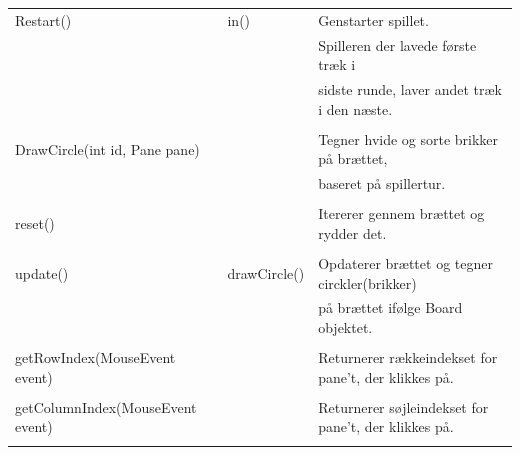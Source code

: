 \begin{table}[H]
\begin{tabular}{lll}
                            Restart() & in() & Genstarter spillet. \\
                         &         &        Spilleren der lavede første træk i \\      &         & sidste runde, laver andet træk i den næste.\\
                         \\
                         DrawCircle(int id, Pane pane) & & Tegner hvide og sorte brikker på brættet, \\
                         & & baseret på spillertur.
                         \\
                         \\
                          reset()                              &                 & Itererer gennem brættet og rydder det.                       \\
                                             &                 &                                                           \\
        update()                             & drawCircle()    & Opdaterer brættet og tegner circkler(brikker)              \\
                                             &                 & på brættet ifølge Board objektet.                          \\
                                             \\
         getRowIndex(MouseEvent event)        &                 & Returnerer rækkeindekset for pane't, der klikkes på.      \\
                                             &                 &                                                           \\
        getColumnIndex(MouseEvent event)     &                 & Returnerer søjleindekset for pane't, der klikkes på.      \\
                                             &                 &                                                           \\
 \bottomrule
    \end{tabular}
\end{table}

